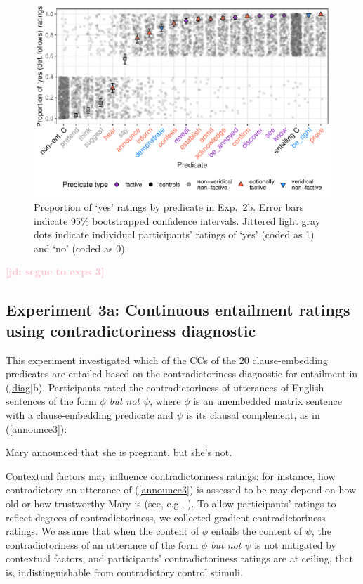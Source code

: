 \documentclass[11pt,fleqn]{article}
\newcommand{\jd}[1]{\textbf{\textcolor{Pink}{[jd: #1]}}}
\newcommand{\6}{\mbox{$[\hspace*{-.6mm}[$}}
\newcommand{\9}{\mbox{$]\hspace*{-.6mm}]$}}
\begin{document}
\begin{figure}[H]
\centering
\includegraphics[width=.7\paperwidth]{../../results/7-veridicality3-binary/graphs/proportion-by-predicate-variability-individual}

\caption{Proportion of `yes' ratings by predicate in Exp.~2b. Error bars indicate 95\% bootstrapped confidence intervals. Jittered light gray dots indicate individual participants' ratings of `yes' (coded as 1) and `no' (coded as 0).}
\label{fig:3aresults}
\end{figure}

\jd{segue to exps 3}

\subsection{Experiment 3a: Continuous entailment ratings using contradictoriness diagnostic}\label{s32}

This experiment investigated which of the CCs of the 20 clause-embedding predicates are entailed based on the contradictoriness diagnostic for entailment in (\ref{diag}b). Participants rated the contradictoriness of utterances of English sentences of the form {\em $\phi$ but not $\psi$}, where $\phi$ is an unembedded matrix sentence with a clause-embedding predicate and $\psi$ is its clausal complement, as in (\ref{announce3}):

\begin{exe}
\ex\label{announce3} Mary announced that she is pregnant, but she's not.
\end{exe}
Contextual factors may influence contradictoriness ratings: for instance, how contradictory an utterance of (\ref{announce3}) is assessed to be may depend on how old or how trustworthy Mary is (see, e.g., \citealt{schlenker10,demarneffe-etal2012}). To allow participants' ratings to reflect degrees of contradictoriness, we collected gradient contradictoriness ratings. We assume that when the content of $\phi$ entails the content of $\psi$, the contradictoriness of an utterance of the form {\em $\phi$ but not $\psi$} is not mitigated by contextual factors, and participants' contradictoriness ratings are at ceiling, that is, indistinguishable from contradictory control stimuli.
\end{document}
